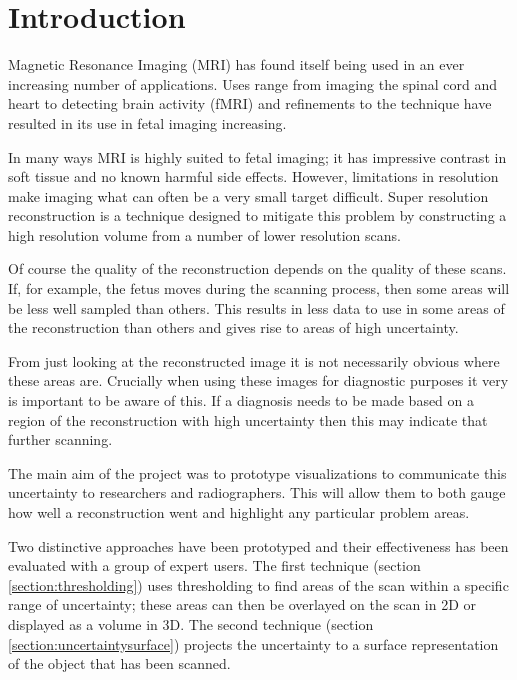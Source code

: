 \chapter{Introduction}\label{chapter:introduction}


Magnetic Resonance Imaging (MRI) has found itself being used in an ever increasing number of applications. Uses range from imaging the spinal cord and heart to detecting brain activity (fMRI) and refinements to the technique have resulted in its use in fetal imaging increasing.

In many ways MRI is highly suited to fetal imaging; it has impressive contrast in soft tissue and no known harmful side effects. However, limitations in resolution make imaging what can often be a very small target difficult. Super resolution reconstruction is a technique designed to mitigate this problem by constructing a high resolution volume from a number of lower resolution scans.

Of course the quality of the reconstruction depends on the quality of these scans. If, for example, the fetus moves during the scanning process, then some areas will be less well sampled than others. This results in less data to use in some areas of the reconstruction than others and gives rise to areas of high uncertainty.
 
From just looking at the reconstructed image it is not necessarily obvious where these areas are. Crucially when using these images for diagnostic purposes it very is important to be aware of this. If a diagnosis needs to be made based on a region of the reconstruction with high uncertainty then this may indicate that further scanning.


The main aim of the project was to prototype visualizations to communicate this uncertainty to researchers and radiographers. This will allow them to both gauge how well a reconstruction went and highlight any particular problem areas.

Two distinctive approaches have been prototyped and their effectiveness has been evaluated with a group of expert users. The first technique (section \ref{section:thresholding}) uses thresholding to find areas of the scan within a specific range of uncertainty; these areas can then be overlayed on the scan in 2D or displayed as a volume in 3D. The second technique (section \ref{section:uncertaintysurface}) projects the uncertainty to a surface representation of the object that has been scanned.

